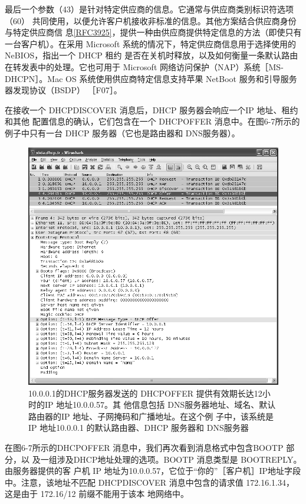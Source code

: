 最后一个参数（43）是针对特定供应商的信息。它通常与供应商类别标识符选项（60）
共同使用，以便允许客户机接收非标准的信息。其他方案结合供应商身份与特定供应商信
息\href{https://www.rfc-editor.org/rfc/rfc3925}{\href{https://www.rfc-editor.org/rfc/rfc3925}{[RFC3925]}}，提供一种由供应商提供特定信息的方法（即使只有一台客户机）。在采用
Microsoft 系统的情况下，特定供应商信息用于选择使用的 NeBIOS，指出一个 DHCP 租约
是否在关机时释放，以及如何衡量一条默认路由在转发表中的处理。它也可用于 Microsoft
网络访问保护（NAP）系统［MS-DHCPN］。Mac OS 系统使用供应商特定信息支持苹果
NetBoot 服务和引导服务器发现协议（BSDP） ［F07］。

在接收一个 DHCPDISCOVER 消息后，DHCP 服务器会响应一个IP 地址、租约和其他
配置信息的确认，它们包含在一个 DHCPOFFER 消息中。在图6-7所示的例子中只有一台
DHCP 服务器（它也是路由器和 DNS服务器）。

\begin{figure}[H]
    \centering
	\includegraphics[scale=0.5]{imgs/6/6-7.png}
	\caption{10.0.0.1的DHCP服务器发送的 DHCPOFFER 提供有效期长达12小时的IP 地址10.0.0.57。其
    他信息包括 DNS服务器地址、域名、默认路由器的IP 地址、子网掩码和广播地址。在这个例
    子中，该系统是 IP 地址10.0.0.1 的默认路由器、DHCP 服务器和 DNS服务器}
\end{figure}

在图6-7所示的DHCPOFFER 消息中，我们再次看到消息格式中包含BOOTP 部分，以
及一组涉及DHCP地址处理的选项。BOOTP 消息类型是 BOOTREPLY。由服务器提供的客
户机 IP 地址为10.0.0.57，它位于“你的”［客户机］IP地址字段中。注意，该地址不匹配
DHCPDISCOVER 消息中包含的请求值 172.16.1.34，这是由于 172.16/12 前缀不能用于该本
地网络中。

